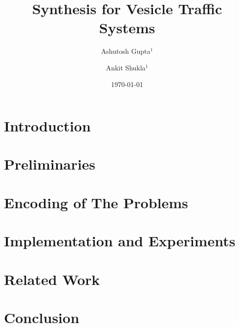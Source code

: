 \documentclass{llncs}
\begin{document}
\title{Synthesis for Vesicle Traffic Systems}

\author{Ashutosh Gupta$^1$ \and Ankit Shukla$^1$}


\date{\today}

\maketitle

\begin{abstract}

\end{abstract}

\section{Introduction}
\label{sec:intro}


\section{Preliminaries}
\label{sec:prelim}


\section{Encoding of The Problems}
\label{sec:encoding}


\section{Implementation and Experiments}
\label{sec:experiments}


\section{Related Work}
\label{sec:related}


\section{Conclusion}
\label{sec:conclusion}




\end{document}
